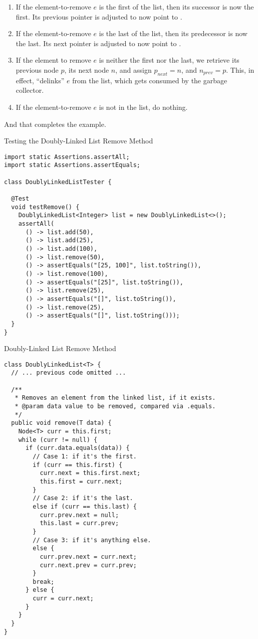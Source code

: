 \begin{enumerate}[label=(\alph*)]
  \item If the element-to-remove $e$ is the first of the list, then its successor is now the first. Its previous pointer is adjusted to now point to .
  \item If the element-to-remove $e$ is the last of the list, then its predecessor is now the last. Its next pointer is adjusted to now point to .
  \item If the element to remove $e$ is neither the first nor the last, we retrieve its previous node $p$, its next node $n$, and assign $p_\textit{next} = n$, and $n_\textit{prev} = p$. This, in effect, ``delinks'' $e$ from the list, which gets consumed by the garbage collector.
  \item If the element-to-remove $e$ is not in the list, do nothing.
\end{enumerate}

And that completes the example.

\begin{cl}{Testing the Doubly-Linked List Remove Method}
\begin{lstlisting}[language=MyJava]
import static Assertions.assertAll;
import static Assertions.assertEquals;

class DoublyLinkedListTester {

  @Test
  void testRemove() {
    DoublyLinkedList<Integer> list = new DoublyLinkedList<>();
    assertAll(
      () -> list.add(50),
      () -> list.add(25),
      () -> list.add(100),
      () -> list.remove(50),
      () -> assertEquals("[25, 100]", list.toString()),
      () -> list.remove(100),
      () -> assertEquals("[25]", list.toString()),
      () -> list.remove(25),
      () -> assertEquals("[]", list.toString()),
      () -> list.remove(25),
      () -> assertEquals("[]", list.toString()));
  }
}
\end{lstlisting}
\end{cl}


\begin{cl}{Doubly-Linked List Remove Method}
\begin{lstlisting}[language=MyJava]
class DoublyLinkedList<T> {
  // ... previous code omitted ...

  /**
   * Removes an element from the linked list, if it exists.
   * @param data value to be removed, compared via .equals.
   */
  public void remove(T data) {
    Node<T> curr = this.first;
    while (curr != null) {
      if (curr.data.equals(data)) {
        // Case 1: if it's the first.
        if (curr == this.first) {
          curr.next = this.first.next;
          this.first = curr.next;
        }
        // Case 2: if it's the last.
        else if (curr == this.last) {
          curr.prev.next = null;
          this.last = curr.prev;
        }
        // Case 3: if it's anything else.
        else {
          curr.prev.next = curr.next;
          curr.next.prev = curr.prev;
        }
        break;
      } else {
        curr = curr.next;
      }
    }
  }
}
\end{lstlisting}
\end{cl}

